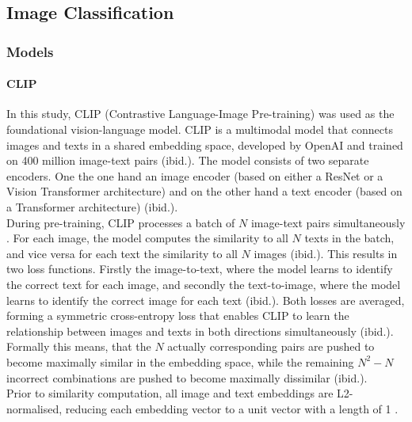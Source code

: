 \documentclass[hidelinks, 11pt]{article}
\begin{document}
\subsection{Image Classification}

\subsubsection{Models}

\paragraph{CLIP}
In this study, CLIP (Contrastive Language-Image Pre-training) \citep{radford_learning_2021} was used as the foundational vision-language model. CLIP is a multimodal model that connects images and texts in a shared embedding space, developed by OpenAI and trained on 400 million image-text pairs (ibid.). The model consists of two separate encoders. One the one hand an image encoder (based on either a ResNet or a Vision Transformer architecture) and on the other hand a text encoder (based on a Transformer architecture) (ibid.).
\\
During pre-training, CLIP processes a batch of $N$ image-text pairs simultaneously \citep{radford_learning_2021}. For each image, the model computes the similarity to all $N$ texts in the batch, and vice versa for each text the similarity to all $N$ images (ibid.). This results in two loss functions. Firstly the image-to-text, where the model learns to identify the correct text for each image, and secondly the text-to-image, where the model learns to identify the correct image for each text (ibid.). Both losses are averaged, forming a symmetric cross-entropy loss that enables CLIP to learn the relationship between images and texts in both directions simultaneously (ibid.). Formally this means, that the $N$ actually corresponding pairs are pushed to become maximally similar in the embedding space, while the remaining $N^2 - N$ incorrect combinations are pushed to become maximally dissimilar (ibid.).
\\
Prior to similarity computation, all image and text embeddings are L2-normalised, reducing each embedding vector to a unit vector with a length of 1 \citep{radford_learning_2021}. 
\end{document}
